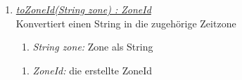 \begin{enumerate}[+]
\item \underline{\textit{toZoneId(String zone) : ZoneId}}\\
Konvertiert einen String in die zugehörige Zeitzone

\begin{enumerate}[$\bullet$]
\item \textit{String zone:} Zone als String
\end{enumerate}
\vspace{-0.2cm}
\begin{enumerate}[$\circ$]
\item \textit{ZoneId:} die erstellte ZoneId
\end{enumerate}

\end{enumerate}
